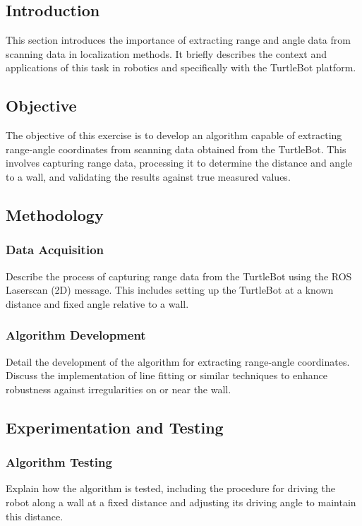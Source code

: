 \documentclass[12pt,a4paper]{article}
\begin{document}
	\subsection{Introduction}
	This section introduces the importance of extracting range and angle data from scanning data in localization methods. It briefly describes the context and applications of this task in robotics and specifically with the TurtleBot platform.
	
	\subsection{Objective}
	The objective of this exercise is to develop an algorithm capable of extracting range-angle coordinates from scanning data obtained from the TurtleBot. This involves capturing range data, processing it to determine the distance and angle to a wall, and validating the results against true measured values.
	
	\subsection{Methodology}
	\subsubsection{Data Acquisition}
	Describe the process of capturing range data from the TurtleBot using the ROS Laserscan (2D) message. This includes setting up the TurtleBot at a known distance and fixed angle relative to a wall.
	
	\subsubsection{Algorithm Development}
	Detail the development of the algorithm for extracting range-angle coordinates. Discuss the implementation of line fitting or similar techniques to enhance robustness against irregularities on or near the wall.
	
	\subsection{Experimentation and Testing}
	\subsubsection{Algorithm Testing}
	Explain how the algorithm is tested, including the procedure for driving the robot along a wall at a fixed distance and adjusting its driving angle to maintain this distance.
	
\end{document}
